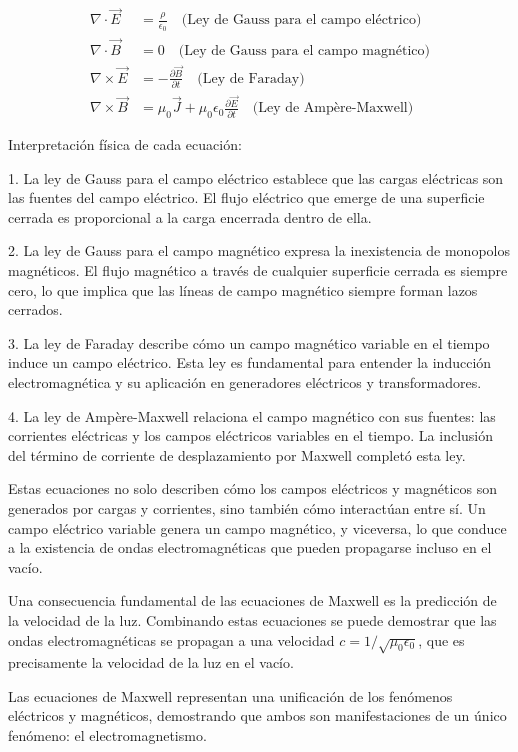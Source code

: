 \documentclass[12pt,a4paper]{book}
\begin{document}
\begin{align}
\nabla \cdot \vec{E} &= \frac{\rho}{\epsilon_0} \quad \text{(Ley de Gauss para el campo eléctrico)} \\
\nabla \cdot \vec{B} &= 0 \quad \text{(Ley de Gauss para el campo magnético)} \\
\nabla \times \vec{E} &= -\frac{\partial \vec{B}}{\partial t} \quad \text{(Ley de Faraday)} \\
\nabla \times \vec{B} &= \mu_0 \vec{J} + \mu_0 \epsilon_0 \frac{\partial \vec{E}}{\partial t} \quad \text{(Ley de Ampère-Maxwell)}
\end{align}

Interpretación física de cada ecuación:

1. La ley de Gauss para el campo eléctrico establece que las cargas eléctricas son las fuentes del campo eléctrico. El flujo eléctrico que emerge de una superficie cerrada es proporcional a la carga encerrada dentro de ella.

2. La ley de Gauss para el campo magnético expresa la inexistencia de monopolos magnéticos. El flujo magnético a través de cualquier superficie cerrada es siempre cero, lo que implica que las líneas de campo magnético siempre forman lazos cerrados.

3. La ley de Faraday describe cómo un campo magnético variable en el tiempo induce un campo eléctrico. Esta ley es fundamental para entender la inducción electromagnética y su aplicación en generadores eléctricos y transformadores.

4. La ley de Ampère-Maxwell relaciona el campo magnético con sus fuentes: las corrientes eléctricas y los campos eléctricos variables en el tiempo. La inclusión del término de corriente de desplazamiento por Maxwell completó esta ley.

Estas ecuaciones no solo describen cómo los campos eléctricos y magnéticos son generados por cargas y corrientes, sino también cómo interactúan entre sí. Un campo eléctrico variable genera un campo magnético, y viceversa, lo que conduce a la existencia de ondas electromagnéticas que pueden propagarse incluso en el vacío.

Una consecuencia fundamental de las ecuaciones de Maxwell es la predicción de la velocidad de la luz. Combinando estas ecuaciones se puede demostrar que las ondas electromagnéticas se propagan a una velocidad $c = 1/\sqrt{\mu_0\epsilon_0}$, que es precisamente la velocidad de la luz en el vacío.

Las ecuaciones de Maxwell representan una unificación de los fenómenos eléctricos y magnéticos, demostrando que ambos son manifestaciones de un único fenómeno: el electromagnetismo.
\end{document}
